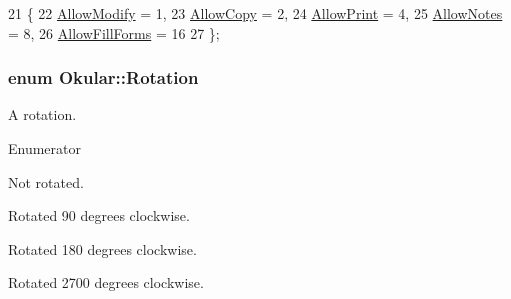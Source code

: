 \begin{DoxyCode}
21 \{
22     \hyperlink{namespaceOkular_a3601f4e702453ddf1125476dd6e7577ba6b449d4f1533d6531535a6ed72e3bbce}{AllowModify} = 1,  
23     \hyperlink{namespaceOkular_a3601f4e702453ddf1125476dd6e7577ba36a60050e67a446a5ff61aac6756718c}{AllowCopy} = 2,    
24     \hyperlink{namespaceOkular_a3601f4e702453ddf1125476dd6e7577ba92e90d638393c1cfd7ead353df6822a4}{AllowPrint} = 4,   
25     \hyperlink{namespaceOkular_a3601f4e702453ddf1125476dd6e7577ba6c10962833bd58ea0f8d63e448eba8e9}{AllowNotes} = 8,   
26     \hyperlink{namespaceOkular_a3601f4e702453ddf1125476dd6e7577ba451db87f0977de39b47316b878722136}{AllowFillForms} = 16     
27 \};
\end{DoxyCode}
\hypertarget{namespaceOkular_a8556d00465f61ef533c6b027669e7da6}{
\subsubsection[{Rotation}]{\setlength{\rightskip}{0pt plus 5cm}enum {\bf Okular\+::\+Rotation}}}\label{namespaceOkular_a8556d00465f61ef533c6b027669e7da6}
A rotation. \begin{Desc}
\item[Enumerator]\par
\begin{description}
\item[{\em 
\hypertarget{namespaceOkular_a8556d00465f61ef533c6b027669e7da6aa4df8fc3dd09e30520c264c8d23d89c2}{Rotation0}\label{namespaceOkular_a8556d00465f61ef533c6b027669e7da6aa4df8fc3dd09e30520c264c8d23d89c2}
}]Not rotated. \item[{\em 
\hypertarget{namespaceOkular_a8556d00465f61ef533c6b027669e7da6a72f281f9a68957920dc968695de4363a}{Rotation90}\label{namespaceOkular_a8556d00465f61ef533c6b027669e7da6a72f281f9a68957920dc968695de4363a}
}]Rotated 90 degrees clockwise. \item[{\em 
\hypertarget{namespaceOkular_a8556d00465f61ef533c6b027669e7da6a95c9d62f7745cb6bf5895007070e8ee9}{Rotation180}\label{namespaceOkular_a8556d00465f61ef533c6b027669e7da6a95c9d62f7745cb6bf5895007070e8ee9}
}]Rotated 180 degrees clockwise. \item[{\em 
\hypertarget{namespaceOkular_a8556d00465f61ef533c6b027669e7da6a01963dd547f5723a6b3975ae67090390}{Rotation270}\label{namespaceOkular_a8556d00465f61ef533c6b027669e7da6a01963dd547f5723a6b3975ae67090390}
}]Rotated 2700 degrees clockwise. \end{description}
\end{Desc}



